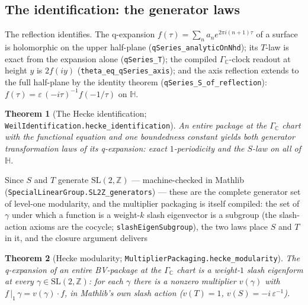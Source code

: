 \documentclass[11pt]{article}
\newtheorem{theorem}{Theorem}
\theoremstyle{definition}
\begin{document}
\subsection*{The identification: the generator laws}

The reflection identifies.  The q-expansion
$f(\tau)=\sum_n a_n e^{2\pi i(n+1)\tau}$ of a surface is holomorphic on the upper
half-plane (\texttt{qSeries\_analyticOnNhd}); its $T$-law is exact from the expansion
alone (\texttt{qSeries\_T}); the compiled $\Gamma_{\mathbb C}$-clock readout at height
$y$ is $2f(iy)$ (\texttt{theta\_eq\_qSeries\_axis}); and the axis reflection extends to
the full half-plane by the identity theorem
(\texttt{qSeries\_S\_of\_reflection}): $f(\tau)=\varepsilon\,(-i\tau)^{-1}f(-1/\tau)$
on $\mathbb H$.

\begin{theorem}[The Hecke identification;
\texttt{WeilIdentification.hecke\_identification}]\label{thm:hecke-ident}
An entire package at the $\Gamma_{\mathbb C}$ chart with the functional equation and
one boundedness constant yields both generator transformation laws of its
q-expansion: exact $1$-periodicity and the $S$-law on all of $\mathbb H$.
\end{theorem}

Since $S$ and $T$ generate $\mathrm{SL}(2,\mathbb Z)$ --- machine-checked in Mathlib
(\texttt{SpecialLinearGroup.SL2Z\_generators}) --- these are the complete generator set
of level-one modularity, and the multiplier packaging is itself compiled: the set of
$\gamma$ under which a function is a weight-$k$ slash eigenvector is a subgroup (the
slash-action axioms are the cocycle; \texttt{slashEigenSubgroup}), the two laws place
$S$ and $T$ in it, and the closure argument delivers

\begin{theorem}[Hecke modularity;
\texttt{MultiplierPackaging.hecke\_modularity}]\label{thm:hecke-modularity}
The q-expansion of an entire BV-package at the $\Gamma_{\mathbb C}$ chart is a
weight-$1$ slash eigenform at \emph{every} $\gamma\in\mathrm{SL}(2,\mathbb Z)$: for
each $\gamma$ there is a nonzero multiplier $v(\gamma)$ with
$f\,|_{1}\,\gamma=v(\gamma)\cdot f$, in Mathlib's own slash action ($v(T)=1$,
$v(S)=-i\,\varepsilon^{-1}$).
\end{theorem}
\end{document}

